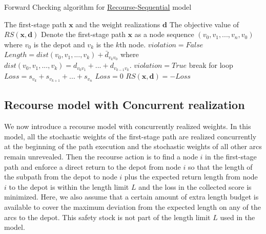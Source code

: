 \documentclass[preprint,review,10pt,round,authoryear]{elsarticle}\usepackage[]{graphicx}\usepackage[]{color}
\theoremstyle{plain}
\theoremstyle{definition}
\theoremstyle{remark}
\begin{document}
\renewcommand{\algorithmicrequire}{\textbf{Input:}} %
\renewcommand{\algorithmicensure}{\textbf{Output:}} %
\begin{algorithm}[h]
\caption{Forward Checking algorithm for \hyperref[eq:rs]{Recourse-Sequential} model}
\begin{algorithmic}[1]
\Require
The first-stage path $\mathbf{x}$ and the weight realizations $\mathbf{d}$
\Ensure
The objective value of $RS(\mathbf{x},\mathbf{d})$
\State Denote the first-stage path $\mathbf{x}$ as a node sequence $(v_0,v_1,...,v_n,v_0)$ where $v_0$ is the depot and $v_k$ is the $k$th node.
\State $violation=False$
\State $Length=dist(v_0,v_1,...,v_k)+\bar{d}_{v_kv_0}$ where $dist(v_0,v_1,...,v_k)=d_{v_0v_1}+...+d_{v_{k-1}v_k}$.
\State $violation=True$
\State break for loop
\EndIf
\EndFor
{}
\State $Loss=s_{v_k}+s_{v_{k+1}}+...+s_{v_n}$
\Else
\State $Loss=0$
\EndIf
\State $RS(\mathbf{x},\mathbf{d})=-Loss$
\end{algorithmic}
\label{algorithm:1} 
\end{algorithm}

\subsection{Recourse model with Concurrent realization}

We now introduce a recourse model with concurrently realized weights. In this model, all the stochastic weights of the first-stage path are realized concurrently at the beginning of the path execution and the stochastic weights of all other arcs remain unrevealed. Then the recourse action is to find a node $i$ in the first-stage path and enforce a direct return to the depot from node $i$ so that the length of the subpath from the depot to node $i$ plus the expected return length from node $i$ to the depot is within the length limit $L$ and the loss in the collected score is minimized. Here, we also assume that a certain amount of extra length budget is available to cover the maximum deviation from the expected length on any of the arcs to the depot. This safety stock is not part of the length limit $L$ used in the model.
\end{document}
